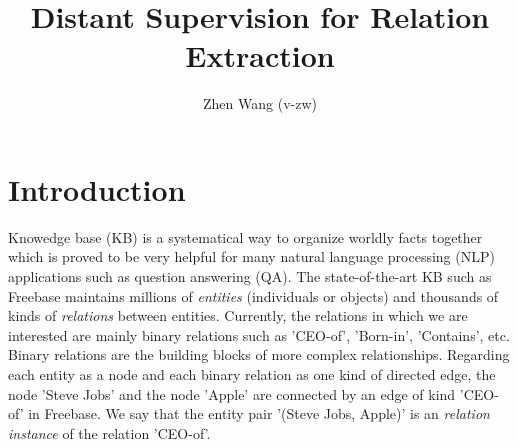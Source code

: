 \documentclass[10pt]{article} %
\title{Distant Supervision for Relation Extraction}
\author{Zhen Wang (v-zw)}
\theoremstyle{definition}
\theoremstyle{definition}
\begin{document}
\maketitle
\section{Introduction}
Knowedge base (KB) is a systematical way to organize worldly facts together which is proved to be very helpful for many natural language processing (NLP) applications such as question answering (QA). 
The state-of-the-art KB such as Freebase maintains millions of \emph{entities} (individuals or objects) and thousands of kinds of \emph{relations} between entities. 
Currently, the relations in which we are interested are mainly binary relations such as 'CEO-of', 'Born-in', 'Contains', etc. 
Binary relations are the building blocks of more complex relationships. 
Regarding each entity as a node and each binary relation as one kind of directed edge, the node 'Steve Jobs' and the node 'Apple' are connected by an edge of kind 'CEO-of' in Freebase. 
We say that the entity pair '(Steve Jobs, Apple)' is an \emph{relation instance} of the relation 'CEO-of'. 
\end{document}
